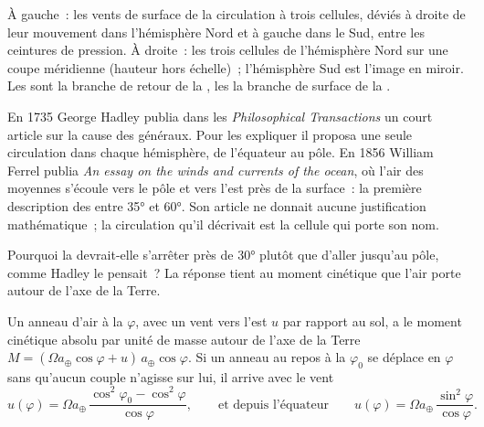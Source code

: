\begin{omfigure}
{\small À gauche~: les vents de surface de la circulation à trois cellules, déviés à droite
de leur mouvement dans l'hémisphère Nord et à gauche dans le Sud, entre
les ceintures de pression. À droite~: les trois cellules de l'hémisphère Nord sur une
coupe méridienne (hauteur hors échelle)~; l'hémisphère Sud est l'image en
miroir. Les  sont la branche de retour de la , les  la
branche de surface de la .}
\label{fig:b1:atmospheric-circulation:three-cells}
\end{omfigure}

\begin{history}
En 1735 George Hadley publia dans les \emph{Philosophical Transactions} un court article
sur la cause des  généraux. Pour les expliquer il proposa une seule
circulation dans chaque hémisphère, de l'équateur au pôle.
En 1856 William Ferrel publia \emph{An essay on the winds and currents of the
ocean}, où l'air des  moyennes s'écoule vers le pôle et vers l'est
près de la surface~: la première description des  entre \ang{35} et \ang{60}.
Son article ne donnait aucune justification mathématique~; la circulation qu'il décrivait est la
cellule qui porte son nom.
\end{history}

Pourquoi la  devrait-elle s'arrêter près de \ang{30} plutôt que d'aller jusqu'au pôle, comme Hadley
le pensait~? La réponse tient au moment cinétique que l'air porte autour de l'axe de la
Terre.

\begin{proposition}\label{prop:b1:atmospheric-circulation:angular-momentum}
Un anneau d'air à la  $\varphi$, avec un vent vers l'est $u$ par rapport au sol,
a le moment cinétique absolu par unité de masse autour de l'axe de la Terre $M =
(\Omega a_\oplus\cos\varphi + u)\,a_\oplus\cos\varphi$. Si un anneau au repos à la
 $\varphi_0$ se déplace en $\varphi$ sans qu'aucun couple n'agisse sur lui, il arrive avec
le vent
\[
  u(\varphi) = \Omega a_\oplus\,\frac{\cos^2\varphi_0 - \cos^2\varphi}{\cos\varphi},
  \qquad\text{et depuis l'équateur}\qquad
  u(\varphi) = \Omega a_\oplus\,\frac{\sin^2\varphi}{\cos\varphi} .
\]
\end{proposition}

